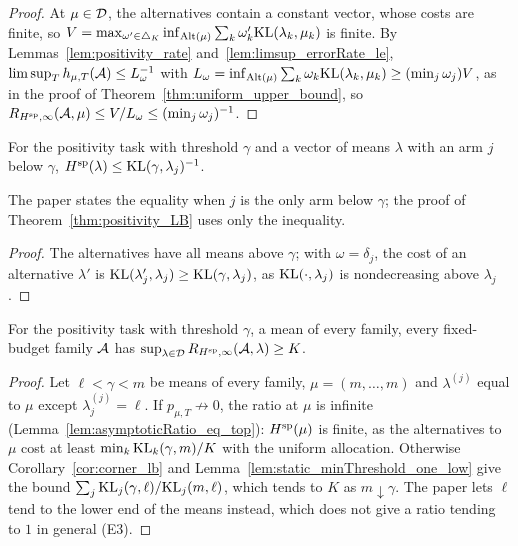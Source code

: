 \begin{proof}
  \leanok
  At $\mu \in \mathcal{D}$, the alternatives contain a constant vector, whose costs are finite, so $V =
  \max_{\omega' \in \triangle_K} \inf_{\mathrm{Alt}(\mu)} \sum_k \omega'_k \mathrm{KL}(\lambda_k, \mu_k)$ is finite. By
  Lemmas~\ref{lem:positivity_rate} and~\ref{lem:limsup_errorRate_le}, $\limsup_T h_{\mu, T}(\mathcal{A})
  \le L_{\omega}^{-1}$ with $L_{\omega} = \inf_{\mathrm{Alt}(\mu)} \sum_k \omega_k \mathrm{KL}(\lambda_k, \mu_k) \ge
  (\min_j \omega_j) V$, as in the proof of Theorem~\ref{thm:uniform_upper_bound}, so
  $R_{H^{\mathrm{sp}}, \infty}(\mathcal{A}, \mu) \le V / L_{\omega} \le (\min_j \omega_j)^{-1}$.
\end{proof}

\begin{lemma}
  \label{lem:static_minThreshold_one_low}
  \leanok
  For the positivity task with threshold $\gamma$ and a vector of means $\lambda$ with an arm $j$
  below $\gamma$, $H^{\mathrm{sp}}(\lambda) \le \mathrm{KL}(\gamma, \lambda_j)^{-1}$.
\end{lemma}

The paper states the equality when $j$ is the only arm below $\gamma$; the proof of
Theorem~\ref{thm:positivity_LB} uses only the inequality.

\begin{proof}
  \leanok
  The alternatives have all means above $\gamma$; with $\omega = \delta_j$, the cost of an
  alternative $\lambda'$ is $\mathrm{KL}(\lambda'_j, \lambda_j) \ge \mathrm{KL}(\gamma, \lambda_j)$, as
  $\mathrm{KL}(\cdot, \lambda_j)$ is nondecreasing above $\lambda_j$.
\end{proof}

\begin{lemma}
  \label{lem:positivity_lower}
  \leanok
  For the positivity task with threshold $\gamma$, a mean of every family, every fixed-budget
  family $\mathcal{A}$ has $\sup_{\lambda \in \mathcal{D}} R_{H^{\mathrm{sp}}, \infty}(\mathcal{A}, \lambda) \ge K$.
\end{lemma}

\begin{proof}
  \leanok
  Let $\ell < \gamma < m$ be means of every family, $\mu = (m, \dots, m)$ and $\lambda^{(j)}$ equal
  to $\mu$ except $\lambda^{(j)}_j = \ell$. If $p_{\mu,T} \not\to 0$, the ratio at $\mu$ is infinite
  (Lemma~\ref{lem:asymptoticRatio_eq_top}): $H^{\mathrm{sp}}(\mu)$ is finite, as the alternatives to $\mu$ cost
  at least $\min_k \mathrm{KL}_k(\gamma, m) / K$ with the uniform allocation. Otherwise
  Corollary~\ref{cor:corner_lb} and Lemma~\ref{lem:static_minThreshold_one_low} give the bound
  $\sum_j \mathrm{KL}_j(\gamma, \ell) / \mathrm{KL}_j(m, \ell)$, which tends to $K$ as $m \downarrow \gamma$. The
  paper lets $\ell$ tend to the lower end of the means instead, which does not give a ratio tending
  to $1$ in general (E3).
\end{proof}

